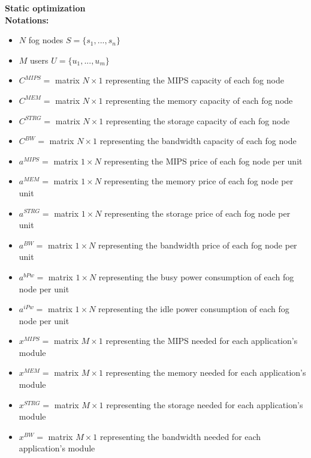 \documentclass{article}
\begin{document}
\pagebreak
\noindent\textbf{Static optimization}\\[12pt]
\noindent\textbf{Notations:}
\begin{itemize}
	\item $N$ fog nodes $S=\{s_1, ..., s_n\}$
	\item $M$ users $U=\{u_1, ..., u_m\}$\\
	
	\item $C^{MIPS}=$ matrix $N\times 1$ representing the MIPS capacity of each fog node
	\item $C^{MEM}=$ matrix $N\times 1$ representing the memory capacity of each fog node
	\item $C^{STRG}=$ matrix $N\times 1$ representing the storage capacity of each fog node
	\item $C^{BW}=$ matrix $N\times 1$ representing the bandwidth capacity of each fog node\\
	
	\item $a^{MIPS}=$ matrix $1\times N$ representing the MIPS price of each fog node per unit
	\item $a^{MEM}=$ matrix $1\times N$ representing the memory price of each fog node per unit
	\item $a^{STRG}=$ matrix $1\times N$ representing the storage price of each fog node per unit
	\item $a^{BW}=$ matrix $1\times N$ representing the bandwidth price of each fog node per unit
	\item $a^{bPw}=$ matrix $1\times N$ representing the busy power consumption of each fog node per unit
	\item $a^{iPw}=$ matrix $1\times N$ representing the idle power consumption of each fog node per unit\\
	
	\item $x^{MIPS}=$ matrix $M\times 1$ representing the MIPS needed for each application's module
	\item $x^{MEM}=$ matrix $M\times 1$ representing the memory needed for each application's module
	\item $x^{STRG}=$ matrix $M\times 1$ representing the storage needed for each application's module
	\item $x^{BW}=$ matrix $M\times 1$ representing the bandwidth needed for each application's module\\
	

\end{itemize}
\end{document}
